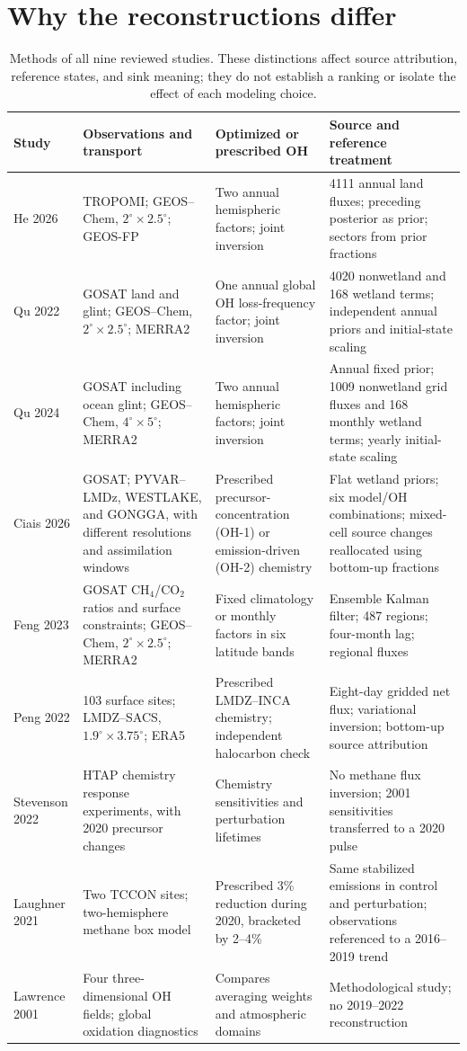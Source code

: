 \documentclass[11pt]{article}
\newcommand{\toprule}{\hline}
\newcommand{\midrule}{\hline}
\newcommand{\bottomrule}{\hline}
\begin{document}
\section{Why the reconstructions differ}
\begin{table}[htbp]\centering\small
\caption{Methods of all nine reviewed studies. These distinctions affect
source attribution, reference states, and sink meaning; they do not establish
a ranking or isolate the effect of each modeling choice.}\label{tab:methods}
\begin{tabularx}{\linewidth}{p{.10\linewidth}YYY}
\toprule Study & Observations and transport & Optimized or prescribed OH & Source and reference treatment\\
\midrule
He 2026 & TROPOMI; GEOS--Chem, $2^\circ\!\times2.5^\circ$; GEOS-FP & Two annual hemispheric factors; joint inversion & 4111 annual land fluxes; preceding posterior as prior; sectors from prior fractions\\
Qu 2022 & GOSAT land and glint; GEOS--Chem, $2^\circ\!\times2.5^\circ$; MERRA2 & One annual global OH loss-frequency factor; joint inversion & 4020 nonwetland and 168 wetland terms; independent annual priors and initial-state scaling\\
Qu 2024 & GOSAT including ocean glint; GEOS--Chem, $4^\circ\!\times5^\circ$; MERRA2 & Two annual hemispheric factors; joint inversion & Annual fixed prior; 1009 nonwetland grid fluxes and 168 monthly wetland terms; yearly initial-state scaling\\
Ciais 2026 & GOSAT; PYVAR--LMDz, WESTLAKE, and GONGGA, with different resolutions and assimilation windows & Prescribed precursor-concentration (OH-1) or emission-driven (OH-2) chemistry & Flat wetland priors; six model/OH combinations; mixed-cell source changes reallocated using bottom-up fractions\\
Feng 2023 & GOSAT CH$_4$/CO$_2$ ratios and surface constraints; GEOS--Chem, $2^\circ\!\times2.5^\circ$; MERRA2 & Fixed climatology or monthly factors in six latitude bands & Ensemble Kalman filter; 487 regions; four-month lag; regional fluxes\\
Peng 2022 & 103 surface sites; LMDZ--SACS, $1.9^\circ\!\times3.75^\circ$; ERA5 & Prescribed LMDZ--INCA chemistry; independent halocarbon check & Eight-day gridded net flux; variational inversion; bottom-up source attribution\\
Stevenson 2022 & HTAP chemistry response experiments, with 2020 precursor changes & Chemistry sensitivities and perturbation lifetimes & No methane flux inversion; 2001 sensitivities transferred to a 2020 pulse\\
Laughner 2021 & Two TCCON sites; two-hemisphere methane box model & Prescribed 3\% reduction during 2020, bracketed by 2--4\% & Same stabilized emissions in control and perturbation; observations referenced to a 2016--2019 trend\\
Lawrence 2001 & Four three-dimensional OH fields; global oxidation diagnostics & Compares averaging weights and atmospheric domains & Methodological study; no 2019--2022 reconstruction\\
\bottomrule
\end{tabularx}\end{table}
\end{document}
